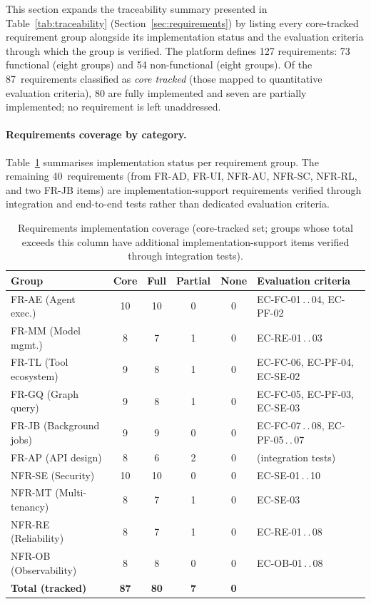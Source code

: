 \documentclass[a4paper,noexaminfo]{sapthesis}
\begin{document}
This section expands the traceability summary presented in
Table~\ref{tab:traceability} (Section~\ref{sec:requirements}) by
listing every core-tracked requirement group alongside its
implementation status and the evaluation criteria through which the
group is verified.  The platform defines 127 requirements: 73
functional (eight groups) and 54 non-functional (eight groups).  Of the
87~requirements classified as \emph{core tracked} (those mapped to
quantitative evaluation criteria), 80 are fully implemented and seven
are partially implemented; no requirement is left unaddressed.

\paragraph{Requirements coverage by category.}
Table~\ref{tab:app-req-coverage} summarises implementation status per
requirement group.  The remaining 40~requirements (from FR-AD, FR-UI,
NFR-AU, NFR-SC, NFR-RL, and two FR-JB items) are
implementation-support requirements verified through integration and
end-to-end tests rather than dedicated evaluation criteria.

\begin{table}[ht]
\centering
\caption{Requirements implementation coverage (core-tracked set;
    groups whose total exceeds this column have additional
    implementation-support items verified through integration tests).}
\label{tab:app-req-coverage}
\footnotesize
\begin{tabularx}{\textwidth}{@{}l c c c c X@{}}
    \hline
    \textbf{Group} & \textbf{Core} & \textbf{Full} & \textbf{Partial}
        & \textbf{None} & \textbf{Evaluation criteria} \\
    \hline
    FR-AE (Agent exec.)     & 10 & 10 & 0 & 0 & EC-FC-01\,.\,.\,04, EC-PF-02 \\
    FR-MM (Model mgmt.)     &  8 &  7 & 1 & 0 & EC-RE-01\,.\,.\,03 \\
    FR-TL (Tool ecosystem)  &  9 &  8 & 1 & 0 & EC-FC-06, EC-PF-04, EC-SE-02 \\
    FR-GQ (Graph query)     &  9 &  8 & 1 & 0 & EC-FC-05, EC-PF-03, EC-SE-03 \\
    FR-JB (Background jobs) &  9 &  9 & 0 & 0 & EC-FC-07\,.\,.\,08, EC-PF-05\,.\,.\,07 \\
    FR-AP (API design)      &  8 &  6 & 2 & 0 & (integration tests) \\
    NFR-SE (Security)       & 10 & 10 & 0 & 0 & EC-SE-01\,.\,.\,10 \\
    NFR-MT (Multi-tenancy)  &  8 &  7 & 1 & 0 & EC-SE-03 \\
    NFR-RE (Reliability)    &  8 &  7 & 1 & 0 & EC-RE-01\,.\,.\,08 \\
    NFR-OB (Observability)  &  8 &  8 & 0 & 0 & EC-OB-01\,.\,.\,08 \\
    \hline
    \textbf{Total (tracked)} & \textbf{87} & \textbf{80} & \textbf{7}
        & \textbf{0} & \\
    \hline
\end{tabularx}
\end{table}
\end{document}
